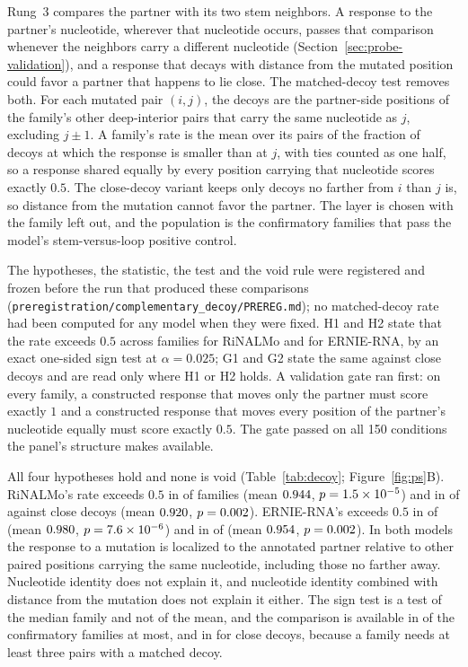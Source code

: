 \documentclass[11pt]{article}
\begin{document}
Rung~3 compares the partner with its two stem neighbors. A response to the
partner's nucleotide, wherever that nucleotide occurs, passes that comparison
whenever the neighbors carry a different nucleotide
(Section~\ref{sec:probe-validation}), and a response that decays with distance
from the mutated position could favor a partner that happens to lie close. The
matched-decoy test removes both. For each mutated pair $(i, j)$, the decoys are
the partner-side positions of the family's other deep-interior pairs that carry
the same nucleotide as $j$, excluding $j \pm 1$. A family's rate is the mean
over its pairs of the fraction of decoys at which the response is smaller than
at $j$, with ties counted as one half, so a response shared equally by every
position carrying that nucleotide scores exactly $0.5$. The close-decoy
variant keeps only decoys no farther from $i$ than $j$ is, so distance from the
mutation cannot favor the partner. The layer is chosen with the family left
out, and the population is the confirmatory families that pass the model's
stem-versus-loop positive control.

The hypotheses, the statistic, the test and the void rule were registered and
frozen before the run that produced these comparisons
(\texttt{preregistration/complementary\_decoy/PREREG.md}); no matched-decoy
rate had been computed for any model when they were fixed. H1 and H2 state that
the rate exceeds $0.5$ across families for RiNALMo and for ERNIE-RNA, by an
exact one-sided sign test at $\alpha = 0.025$; G1 and G2 state the same against
close decoys and are read only where H1 or H2 holds. A validation gate ran
first: on every family, a constructed response that moves only the partner
must score exactly $1$ and a constructed response that moves every position of
the partner's nucleotide equally must score exactly $0.5$. The gate passed on
all 150 conditions the panel's structure makes available.



All four hypotheses hold and none is void (Table~\ref{tab:decoy}; Figure~\ref{fig:ps}B). RiNALMo's
rate exceeds $0.5$ in \decoyAllAboveRiNALMo{} of \decoyAllFamiliesRiNALMo{}
families (mean $0.944{}$, $p = 1.5 \times 10^{-5}{}$) and in
\decoyCloseAboveRiNALMo{} of \decoyCloseFamiliesRiNALMo{} against close decoys
(mean $0.920{}$, $p = 0.002{}$). ERNIE-RNA's
exceeds $0.5$ in \decoyAllAboveErnieRNA{} of \decoyAllFamiliesErnieRNA{}
(mean $0.980{}$, $p = 7.6 \times 10^{-6}{}$) and in
\decoyCloseAboveErnieRNA{} of \decoyCloseFamiliesErnieRNA{}
(mean $0.954{}$, $p = 0.002{}$). In both
models the response to a mutation is localized to the annotated partner
relative to other paired positions carrying the same nucleotide, including
those no farther away. Nucleotide identity does not explain it, and nucleotide
identity combined with distance from the mutation does not explain it either.
The sign test is a test of the median family and not of the mean, and the
comparison is available in \decoyAllFamiliesErnieRNA{} of the \confirmatoryN{}
confirmatory families at most, and in \decoyCloseFamiliesErnieRNA{} for close
decoys, because a family needs at least three pairs with a matched decoy.
\end{document}

